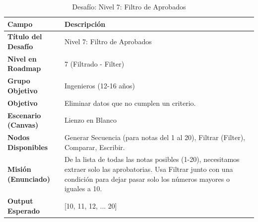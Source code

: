 \begin{table}[H]
    \centering
    \caption{Desafío: Nivel 7: Filtro de Aprobados}
    \label{tab:desafio-ing-7}
    \begingroup
    \renewcommand{\arraystretch}{\TableRowStretch}
    \begin{tabularx}{\textwidth}{ l X }
        \hline
        \textbf{Campo}              & \textbf{Descripción}                                                                                                                                                                     \\
        \hline
        \textbf{Título del Desafío} & Nivel 7: Filtro de Aprobados                                                                                                                                                             \\
        \textbf{Nivel en Roadmap}   & 7 (Filtrado - Filter)                                                                                                                                                                    \\
        \textbf{Grupo Objetivo}     & Ingenieros (12-16 años)                                                                                                                                                                  \\
        \textbf{Objetivo}           & Eliminar datos que no cumplen un criterio.                                                                                                                                               \\
        \textbf{Escenario (Canvas)} & Lienzo en Blanco                                                                                                                                                                         \\
        \textbf{Nodos Disponibles}  & Generar Secuencia (para notas del 1 al 20), Filtrar (Filter), Comparar, Escribir.                                                                                                        \\
        \textbf{Misión (Enunciado)} & De la lista de todas las notas posibles (1-20), necesitamos extraer solo las aprobatorias. Usa Filtrar junto con una condición para dejar pasar solo los números mayores o iguales a 10. \\
        \textbf{Output Esperado}    & [10, 11, 12, ... 20]                                                                                                                                                                     \\
        \hline
    \end{tabularx}
    \endgroup
\end{table}

